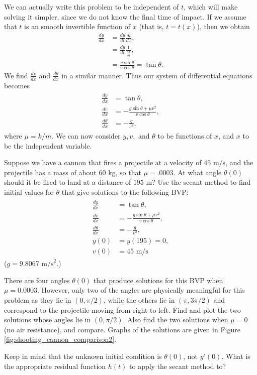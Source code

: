 We can actually write this problem to be independent of \(t\), which will make solving it simpler, since we do not know the final time of impact.
If we assume that $t$ is an smooth invertible function of $x$ (that is, $t = t(x)$), then we obtain
\begin{align*}
\frac{dy}{dx} &= \frac{dy}{dt}\frac{dt}{dx} ,\\
&= \frac{dy}{dt} \frac{1}{\frac{dx}{dt}}, \\
&= \frac{v \sin{\theta}}{v\cos{\theta}} = \tan{\theta}.
\end{align*}
We find $\frac{dv}{dx}$ and $\frac{d\theta}{dx}$ in a similar manner.
Thus our system of differential equations becomes
\begin{align}
	\begin{split}
\frac{dy}{dx} &= \tan {\theta} ,\\
\frac{dv}{dx} &= -\frac{g \sin{\theta} + \mu v^2}{v \cos{\theta}},\\
\frac{d\theta}{dx} &= -\frac{g}{v^2}, \label{eqn:cannon_DEs}
	\end{split}
\end{align}
where $\mu = k/m.$
We can now consider \(y,v,\) and \(\theta\) to be functions of \(x\), and \(x\) to be the independent variable.

\begin{problem}
Suppose we have a cannon that fires a projectile at a velocity of $45\text{ m/s}$, and the projectile has a mass of about $60$ kg, so that $\mu = .0003$.
At what angle $\theta(0)$ should it be fired to land at a distance of $195\text{ m}$?
Use the secant method to find initial values for \(\theta\) that give solutions to the following BVP:
\begin{align}
	\label{eqn:cannon_shooting}
	\begin{split}
\frac{dy}{dx} &= \tan {\theta} ,\\
\frac{dv}{dx} &= -\frac{g \sin{\theta} + \mu v^2}{v \cos{\theta}},\\
\frac{d\theta}{dx} &= -\frac{g}{v^2},\\
y(0)&= y(195) = 0,\\
v(0) &= 45 \text{ m/s}
	\end{split}
\end{align}
($g = 9.8067\text{ m/s}^2$.)

There are four angles $\theta(0)$ that produce solutions for this BVP when $\mu = 0.0003$.
However, only two of the angles are physically meaningful for this problem as they lie in $(0, \pi/2)$, while the others lie in $(\pi, 3\pi/2)$ and correspond to the projectile moving from right to left.
Find and plot the two solutions whose angles lie in $(0, \pi/2)$.
Also find the two solutions when $\mu = 0$ (no air resistance), and compare.
Graphs of the solutions are given in Figure \ref{fig:shooting_cannon_comparison2}.

Keep in mind that the unknown initial condition is $\theta(0)$, not $y'(0)$.
What is the appropriate residual function $h(t)$ to apply the secant method to?
\end{problem}


